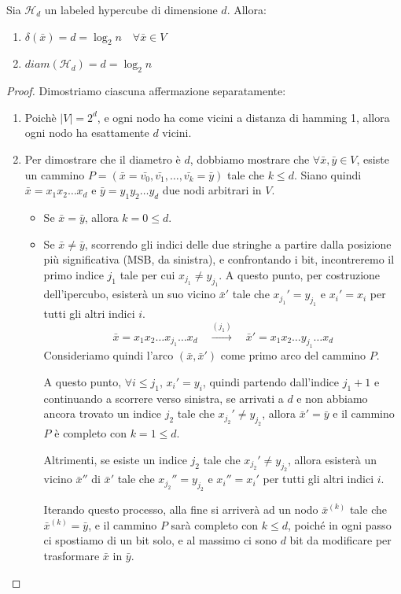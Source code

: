 \begin{teorema}
    Sia $\mathcal{H}_d$ un labeled hypercube di dimensione $d$. Allora:
    \begin{enumerate}
        \item $\delta(\bar{x}) = d = \log_2 n \quad \forall \bar{x} \in V$
        \item $diam(\mathcal{H}_d) = d = \log_2 n$
    \end{enumerate}
    \begin{proof}
        Dimostriamo ciascuna affermazione separatamente:
        \begin{enumerate}
            \item Poichè $|V| = 2^d$, e ogni nodo ha come vicini a distanza di hamming 1, allora ogni nodo ha esattamente $d$ vicini.
            \item Per dimostrare che il diametro è $d$, dobbiamo mostrare che $\forall \bar{x}, \bar{y} \in V$, esiste un cammino $P = (\bar{x} = \bar{v_0}, \bar{v_1}, \ldots, \bar{v_k} = \bar{y})$ tale che $k \leq d$. Siano quindi $\bar{x} = x_1 x_2 \ldots x_d$ e $\bar{y} = y_1 y_2 \ldots y_d$ due nodi arbitrari in $V$.
            \begin{itemize}
                \item Se $\bar{x} = \bar{y}$, allora $k = 0 \leq d$.
                \item Se $\bar{x} \neq \bar{y}$, scorrendo gli indici delle due stringhe a partire dalla posizione più significativa (MSB, da sinistra), e confrontando i bit, incontreremo il primo indice $j_1$ tale per cui $x_{j_1} \neq y_{j_1}$. A questo punto, per costruzione dell'ipercubo, esisterà un suo vicino $\bar{x}'$ tale che $x_{j_1}' = y_{j_1}$ e $x_i' = x_i$ per tutti gli altri indici $i$.
                \[
                    \bar{x} = x_1 x_2 \ldots x_{j_1} \ldots x_d \quad \xrightarrow{(j_1)} \quad \bar{x}' = x_1 x_2 \ldots y_{j_1} \ldots x_d
                \]
                Consideriamo quindi l'arco $(\bar{x}, \bar{x}')$ come primo arco del cammino $P$.

                A questo punto, $\forall i \leq j_1$, $x_i' = y_i$, quindi partendo dall'indice $j_1 + 1$ e continuando a scorrere verso sinistra, se arrivati a $d$ e non abbiamo ancora trovato un indice $j_2$ tale che $x_{j_2}' \neq y_{j_2}$, allora $\bar{x}' = \bar{y}$ e il cammino $P$ è completo con $k = 1 \leq d$.
                
                Altrimenti, se esiste un indice $j_2$ tale che $x_{j_2}' \neq y_{j_2}$, allora esisterà un vicino $\bar{x}''$ di $\bar{x}'$ tale che $x_{j_2}'' = y_{j_2}$ e $x_i'' = x_i'$ per tutti gli altri indici $i$.

                Iterando questo processo, alla fine si arriverà ad un nodo $\bar{x}^{(k)}$ tale che $\bar{x}^{(k)} = \bar{y}$, e il cammino $P$ sarà completo con $k \leq d$, poiché in ogni passo ci spostiamo di un bit solo, e al massimo ci sono $d$ bit da modificare per trasformare $\bar{x}$ in $\bar{y}$.
            \end{itemize}
        \end{enumerate}
    \end{proof}
\end{teorema}

